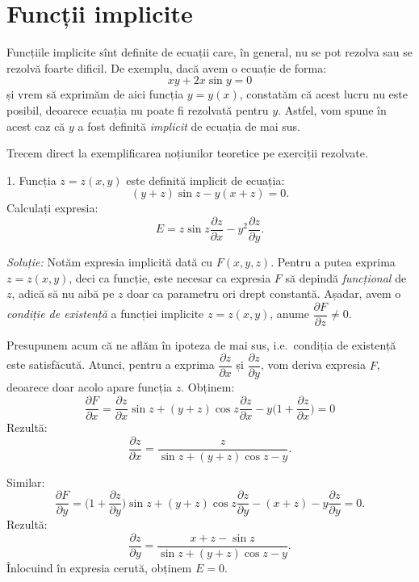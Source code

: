 \chapter{Funcții implicite}


Funcțiile implicite sînt definite de ecuații care, în general, nu se pot
rezolva sau se rezolvă foarte dificil. De exemplu, dacă avem o ecuație
de forma:
\[
  xy + 2x\sin y = 0
\]
și vrem să exprimăm de aici funcția $ y = y(x) $, constatăm că acest
lucru nu este posibil, deoarece ecuația nu poate fi rezolvată pentru $ y $.
Astfel, vom spune în acest caz că $ y $ a fost definită \emph{implicit}
de ecuația de mai sus.

Trecem direct la exemplificarea noțiunilor teoretice pe exerciții rezolvate.

\vspace{1cm}

1. Funcția $ z = z(x, y) $ este definită implicit de ecuația:
\[
  (y + z) \sin z - y (x + z) = 0.
\]
Calculați expresia:
\[
  E = z \sin z \frac{\partial z}{\partial x} - y^2 \frac{\partial z}{\partial y}.
\]

\emph{Soluție:} Notăm expresia implicită dată cu $ F(x, y, z) $. Pentru a putea
exprima $ z = z(x, y) $, deci ca funcție, este necesar ca expresia $ F $ să depindă
\emph{funcțional} de $ z $, adică să nu aibă pe $ z $ doar ca parametru ori drept
constantă. Așadar, avem o \emph{condiție de existență} a funcției implicite
$ z = z(x, y) $, anume $ \dfrac{\partial F}{\partial z} \neq 0 $.

Presupunem acum că ne aflăm în ipoteza de mai sus, i.e.\ condiția de existență
este satisfăcută. Atunci, pentru a exprima $ \dfrac{\partial z}{\partial x} $
și $ \dfrac{\partial z}{\partial y} $, vom deriva expresia $ F $, deoarece
doar acolo apare funcția $ z $. Obținem:
\[
  \frac{\partial F}{\partial x} = \frac{\partial z}{\partial x} \sin z + %
  (y + z) \cos z \dfrac{\partial z}{\partial x} - %
  y\Big(1 + \dfrac{\partial z}{\partial x} \Big) = 0
\]
Rezultă:
\[
  \frac{\partial z}{\partial x} = \frac{z}{\sin z + (y + z) \cos z - y}.
\]

Similar:
\[
  \frac{\partial F}{\partial y} = \Big(1 + \frac{\partial z}{\partial y} \Big) \sin z + %
  (y + z) \cos z \frac{\partial z}{\partial y} - (x + z) - y \frac{\partial z}{\partial y} = 0.
\]
Rezultă:
\[
  \frac{\partial z}{\partial y} = \dfrac{x + z - \sin z}{\sin z + (y + z)\cos z - y}.
\]
Înlocuind în expresia cerută, obținem $ E = 0 $.

\vspace{1cm}

